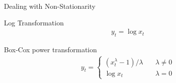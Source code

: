 \documentclass[ignorenonframetext,xcolor=x11names]{beamer}
\begin{document}







\begin{frame}[label=full]{Dealing with Non-Stationarity}
\begin{block}{Log Transformation}
  \begin{align*}y_t = \log x_t\end{align*}
\end{block}
\begin{block}{Box-Cox power transformation}
  \begin{align*}y_t = \begin{cases}(x_t^\lambda-1)/\lambda &\quad \lambda\neq0 \\
  \log x_t &\quad \lambda=0
  \end{cases}
  \end{align*}
\end{block}
\end{frame}
\end{document}
